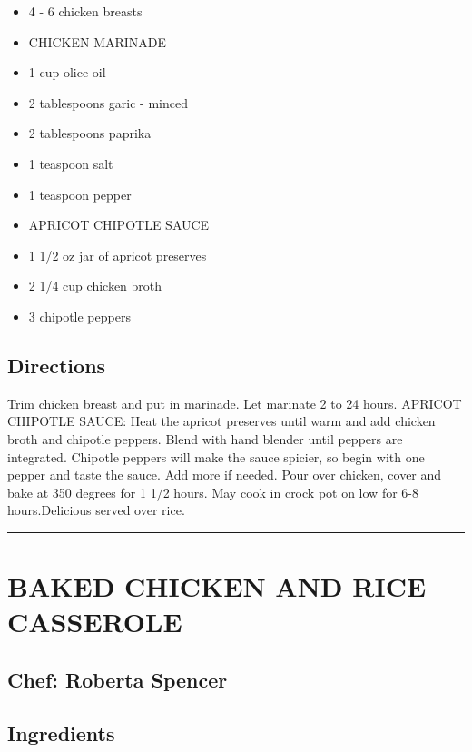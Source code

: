 \documentclass[
]{book}
\providecommand{\tightlist}{%
  \setlength{\itemsep}{0pt}\setlength{\parskip}{0pt}}
\begin{document}
\begin{itemize}
\tightlist
\item
  4 - 6 chicken breasts
\item
  CHICKEN MARINADE
\item
  1 cup olice oil
\item
  2 tablespoons garic - minced
\item
  2 tablespoons paprika
\item
  1 teaspoon salt
\item
  1 teaspoon pepper
\item
  APRICOT CHIPOTLE SAUCE
\item
  1 1/2 oz jar of apricot preserves
\item
  2 1/4 cup chicken broth
\item
  3 chipotle peppers
\end{itemize}

\hypertarget{directions-40}{%
\subsection*{Directions}\label{directions-40}}


Trim chicken breast and put in marinade. Let marinate 2 to 24 hours. APRICOT CHIPOTLE SAUCE: Heat the apricot preserves until warm and add chicken broth and chipotle peppers. Blend with hand blender until peppers are integrated. Chipotle peppers will make the sauce spicier, so begin with one pepper and taste the sauce. Add more if needed. Pour over chicken, cover and bake at 350 degrees for 1 1/2 hours. May cook in crock pot on low for 6-8 hours.Delicious served over rice.

\begin{center}\rule{0.5\linewidth}{0.5pt}\end{center}

\hypertarget{baked-chicken-and-rice-casserole}{%
\section*{BAKED CHICKEN AND RICE CASSEROLE}\label{baked-chicken-and-rice-casserole}}


\hypertarget{chef-roberta-spencer-14}{%
\subsection*{Chef: Roberta Spencer}\label{chef-roberta-spencer-14}}


\hypertarget{ingredients-41}{%
\subsection*{Ingredients}\label{ingredients-41}}
\end{document}

